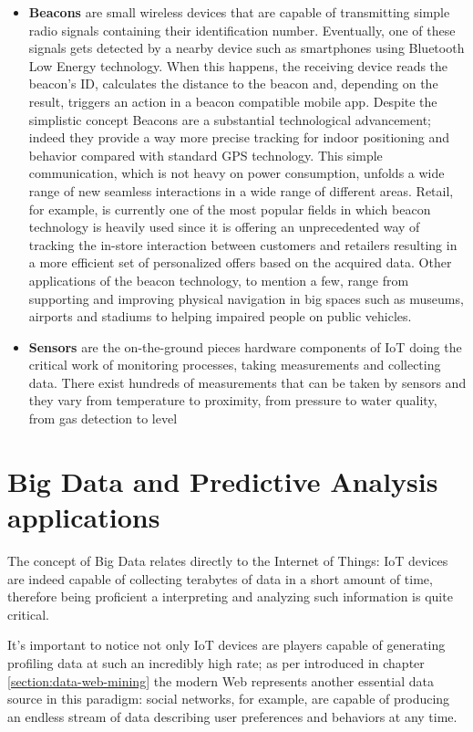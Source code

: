 \begin{itemize}
  \item \textbf{Beacons} are small wireless devices that are capable of transmitting simple radio signals containing their identification number. Eventually, one of these signals gets detected by a nearby device such as smartphones using Bluetooth Low Energy technology. When this happens, the receiving device reads the beacon's ID, calculates the distance to the beacon and, depending on the result, triggers an action in a beacon compatible mobile app. Despite the simplistic concept Beacons are a substantial technological advancement; indeed they provide a way more precise tracking for indoor positioning and behavior compared with standard GPS technology. This simple communication, which is not heavy on power consumption, unfolds a wide range of new seamless interactions in a wide range of different areas. Retail, for example, is currently one of the most popular fields in which beacon technology is heavily used since it is offering an unprecedented way of tracking the in-store interaction between customers and retailers resulting in a more efficient set of personalized offers based on the acquired data. Other applications of the beacon technology, to mention a few, range from supporting and improving physical navigation in big spaces such as museums, airports and stadiums to helping impaired people on public vehicles.

  \item \textbf{Sensors} are the on-the-ground pieces hardware components of IoT doing the critical work of monitoring processes, taking measurements and collecting data. There exist hundreds of measurements that can be taken by sensors and they vary from temperature to proximity, from pressure to water quality, from gas detection to level 

\end{itemize} 

\section{Big Data and Predictive Analysis applications}

The concept of Big Data relates directly to the Internet of Things: IoT devices are indeed capable of collecting terabytes of data in a short amount of time, therefore being proficient a interpreting and analyzing such information is quite critical.

It's important to notice not only IoT devices are players capable of generating profiling data at such an incredibly high rate;  as per introduced in chapter \ref{section:data-web-mining} the modern Web represents another essential data source in this paradigm: social networks, for example, are capable of producing an endless stream of data describing user preferences and behaviors at any time.

